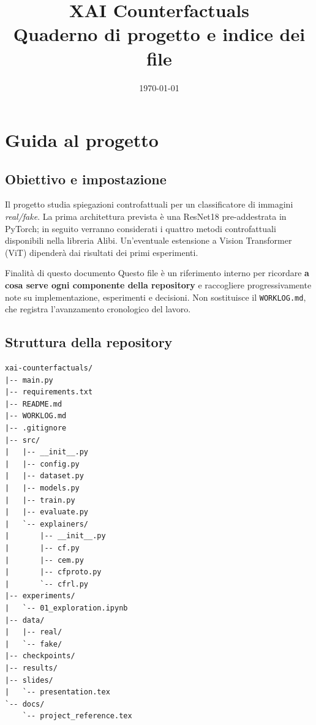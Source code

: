\documentclass[10pt,a4paper,oneside]{book}
\title{\textbf{XAI Counterfactuals}\\[0.4em]
       \large Quaderno di progetto e indice dei file}
\author{}
\date{\today}
\begin{document}
\maketitle
\tableofcontents

\chapter{Guida al progetto}

\section{Obiettivo e impostazione}

Il progetto studia spiegazioni controfattuali per un classificatore di immagini
\textit{real/fake}. La prima architettura prevista è una ResNet18 pre-addestrata
in PyTorch; in seguito verranno considerati i quattro metodi controfattuali
disponibili nella libreria Alibi. Un'eventuale estensione a Vision Transformer
(ViT) dipenderà dai risultati dei primi esperimenti.

\begin{importantbox}{Finalità di questo documento}
Questo file è un riferimento interno per ricordare \textbf{a cosa serve ogni
componente della repository} e raccogliere progressivamente note su
implementazione, esperimenti e decisioni. Non sostituisce il
\texttt{WORKLOG.md}, che registra l'avanzamento cronologico del lavoro.
\end{importantbox}

\section{Struttura della repository}

\begin{verbatim}
xai-counterfactuals/
|-- main.py
|-- requirements.txt
|-- README.md
|-- WORKLOG.md
|-- .gitignore
|-- src/
|   |-- __init__.py
|   |-- config.py
|   |-- dataset.py
|   |-- models.py
|   |-- train.py
|   |-- evaluate.py
|   `-- explainers/
|       |-- __init__.py
|       |-- cf.py
|       |-- cem.py
|       |-- cfproto.py
|       `-- cfrl.py
|-- experiments/
|   `-- 01_exploration.ipynb
|-- data/
|   |-- real/
|   `-- fake/
|-- checkpoints/
|-- results/
|-- slides/
|   `-- presentation.tex
`-- docs/
    `-- project_reference.tex
\end{verbatim}
\end{document}
